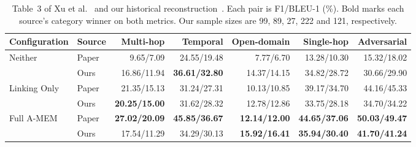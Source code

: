 \documentclass[11pt,a4paper]{article}
\begin{document}
\begin{table}[H]\centering\small\setlength{\tabcolsep}{2pt}
\begin{tabular*}{\linewidth}{@{\extracolsep{\fill}}llrrrrr@{}}
\toprule
Configuration & Source & Multi-hop & Temporal & Open-domain & Single-hop & Adversarial \\
\midrule
Neither & Paper & 9.65/7.09 & 24.55/19.48 & 7.77/6.70 & 13.28/10.30 & 15.32/18.02 \\
        & Ours  & 16.86/11.94 & \textbf{36.61/32.80} & 14.37/14.15 & 34.82/28.72 & 30.66/29.90 \\
\addlinespace[2pt]
Linking Only & Paper & 21.35/15.13 & 31.24/27.31 & 10.13/10.85 & 39.17/34.70 & 44.16/45.33 \\
        & Ours  & \textbf{20.25/15.00} & 31.62/28.32 & 12.78/12.86 & 33.75/28.18 & 34.70/34.22 \\
\addlinespace[2pt]
Full A-MEM & Paper & \textbf{27.02/20.09} & \textbf{45.85/36.67} & \textbf{12.14/12.00} & \textbf{44.65/37.06} & \textbf{50.03/49.47} \\
           & Ours & 17.54/11.29 & 34.29/30.13 & \textbf{15.92/16.41} & \textbf{35.94/30.40} & \textbf{41.70/41.24} \\
\bottomrule\end{tabular*}
\caption{Table~3 of Xu et al.~\cite{xu2025amem} and our historical reconstruction~\cite{acceptedresults}. Each pair is F1/BLEU-1 (\%). Bold marks each source’s category winner on both metrics. Our sample sizes are 99, 89, 27, 222 and 121, respectively.}\label{tab:direct}
\end{table}
\end{document}
